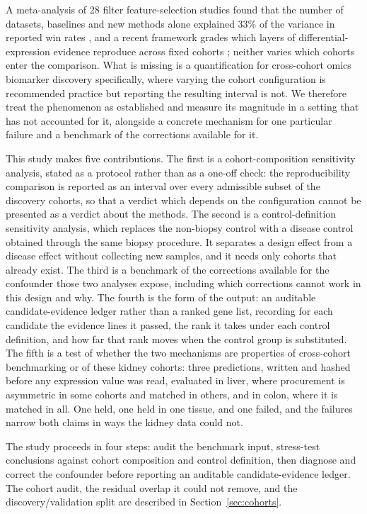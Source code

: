 \documentclass[pdflatex,sn-vancouver-num]{sn-jnl}
\theoremstyle{thmstyleone}
\theoremstyle{thmstyletwo}
\theoremstyle{thmstylethree}
\begin{document}
A meta-analysis of 28 filter feature-selection studies found that the number of datasets,
baselines and new methods alone explained 33\% of the variance in reported win rates
\cite{ebiele2026}, and a recent framework grades which layers of differential-expression evidence
reproduce across fixed cohorts \cite{angelakis2026}; neither varies which cohorts enter the
comparison. What is missing is a quantification for cross-cohort omics biomarker discovery specifically,
where varying the cohort configuration is recommended practice but reporting the resulting
interval is not. We therefore treat the phenomenon as established and measure its magnitude in a
setting that has not accounted for it, alongside a concrete mechanism for one particular failure
and a benchmark of the corrections available for it.

This study makes five contributions. The first is a cohort-composition sensitivity analysis,
stated as a protocol rather than as a one-off check: the reproducibility comparison is reported
as an interval over every admissible subset of the discovery cohorts, so that a verdict which
depends on the configuration cannot be presented as a verdict about the methods. The second is a
control-definition sensitivity analysis, which replaces the non-biopsy control with a disease
control obtained through the same biopsy procedure. It separates a design effect from a disease
effect without collecting new samples, and it needs only cohorts that already exist. The third is
a benchmark of the corrections available for the confounder those two analyses expose, including
which corrections cannot work in this design and why. The fourth is the form of the output: an
auditable candidate-evidence ledger rather than a ranked gene list, recording for each candidate
the evidence lines it passed, the rank it takes under each control definition, and how far that
rank moves when the control group is substituted. The fifth is a test of whether the two
mechanisms are properties of cross-cohort benchmarking or of these kidney cohorts: three
predictions, written and hashed before any expression value was read, evaluated in liver, where
procurement is asymmetric in some cohorts and matched in others, and in colon, where it is
matched in all. One held, one held in one tissue, and one failed, and the failures narrow both
claims in ways the kidney data could not.

The study proceeds in four steps: audit the benchmark input, stress-test conclusions against cohort composition and control definition, then diagnose and correct the confounder before reporting an auditable candidate-evidence ledger. The cohort audit, the residual overlap it could not remove, and the discovery/validation split are described in Section~\ref{sec:cohorts}.
\end{document}
